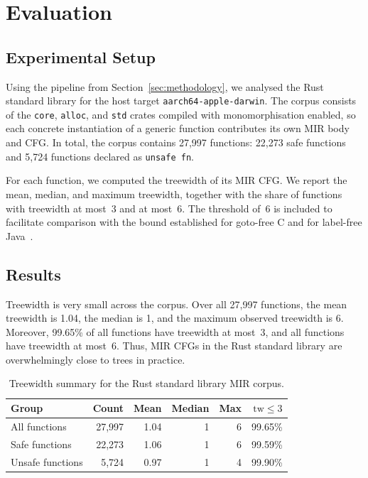 \section{Evaluation}
\label{sec:evaluation}

\subsection{Experimental Setup}
\label{subsec:setup}

Using the pipeline from Section~\ref{sec:methodology}, we analysed the Rust standard library for the host target \texttt{aarch64-apple-darwin}. The corpus consists of the \texttt{core}, \texttt{alloc}, and \texttt{std} crates compiled with monomorphisation enabled, so each concrete instantiation of a generic function contributes its own MIR body and CFG. In total, the corpus contains 27{,}997 functions: 22{,}273 safe functions and 5{,}724 functions declared as \texttt{unsafe fn}.

For each function, we computed the treewidth of its MIR CFG. We report the mean, median, and maximum treewidth, together with the share of functions with treewidth at most~3 and at most~6. The threshold of~6 is included to facilitate comparison with the bound established for goto-free C and for label-free Java~\cite{thorup_1998,gustedt_2002}.

\subsection{Results}
\label{subsec:results}

Treewidth is very small across the corpus. Over all 27{,}997 functions, the mean treewidth is 1.04, the median is 1, and the maximum observed treewidth is 6. Moreover, 99.65\% of all functions have treewidth at most~3, and all functions have treewidth at most~6. Thus, MIR CFGs in the Rust standard library are overwhelmingly close to trees in practice.

\begin{table}[h]
	\centering
	\begin{tabular}{lrrrrr}
		\hline
		Group            & Count    & Mean & Median & Max & $\mathrm{tw} \leq 3$ \\
		\hline
		All functions    & 27{,}997 & 1.04 & 1      & 6   & 99.65\%              \\
		Safe functions   & 22{,}273 & 1.06 & 1      & 6   & 99.59\%              \\
		Unsafe functions & 5{,}724  & 0.97 & 1      & 4   & 99.90\%              \\
		\hline
	\end{tabular}
	\caption{Treewidth summary for the Rust standard library MIR corpus.}
	\label{tab:evaluation-summary}
\end{table}

